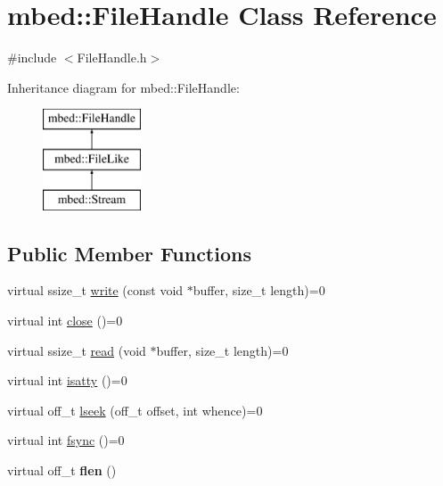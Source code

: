 \hypertarget{classmbed_1_1_file_handle}{}\section{mbed\+:\+:File\+Handle Class Reference}
\label{classmbed_1_1_file_handle}


{\ttfamily \#include $<$File\+Handle.\+h$>$}

Inheritance diagram for mbed\+:\+:File\+Handle\+:\begin{figure}[H]
\begin{center}
\leavevmode
\includegraphics[height=3.000000cm]{classmbed_1_1_file_handle}
\end{center}
\end{figure}
\subsection*{Public Member Functions}
\begin{DoxyCompactItemize}
\item 
virtual ssize\+\_\+t \hyperlink{classmbed_1_1_file_handle_afecb50bd072d06e2a56dbc4f4e68bbf5}{write} (const void $\ast$buffer, size\+\_\+t length)=0
\item 
virtual int \hyperlink{classmbed_1_1_file_handle_ac1b885028d295f74d73ff40bf6a352a2}{close} ()=0
\item 
virtual ssize\+\_\+t \hyperlink{classmbed_1_1_file_handle_ae51be2d8f51d767ba8cd8c646f211f24}{read} (void $\ast$buffer, size\+\_\+t length)=0
\item 
virtual int \hyperlink{classmbed_1_1_file_handle_a7e7936ba41fb44a4f98795fba1d92e83}{isatty} ()=0
\item 
virtual off\+\_\+t \hyperlink{classmbed_1_1_file_handle_a75046a7181de9902af9256302d57316a}{lseek} (off\+\_\+t offset, int whence)=0
\item 
virtual int \hyperlink{classmbed_1_1_file_handle_a125e7fa0507f9b935f28852ca79190b7}{fsync} ()=0
\item 
virtual off\+\_\+t {\bfseries flen} ()\hypertarget{classmbed_1_1_file_handle_a991dddade770154bd53b613b15a251a9}{}\label{classmbed_1_1_file_handle_a991dddade770154bd53b613b15a251a9}

\end{DoxyCompactItemize}



